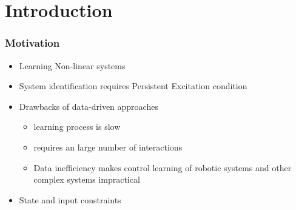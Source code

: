 \section{Introduction}
\label{sec:motivation}
\begin{frame}
    \frametitle{Motivation}
    \begin{itemize}
        \item Learning Non-linear systems
        \item System identification requires Persistent Excitation condition %
        \item Drawbacks of data-driven approaches
	   \begin{itemize}
            \item learning process is slow 
		\item requires an large number of interactions
            \item Data inefficiency makes control learning of robotic systems and other complex systems impractical  %
	   \end{itemize}
        \item State and input constraints 

    \end{itemize}
\end{frame}	

